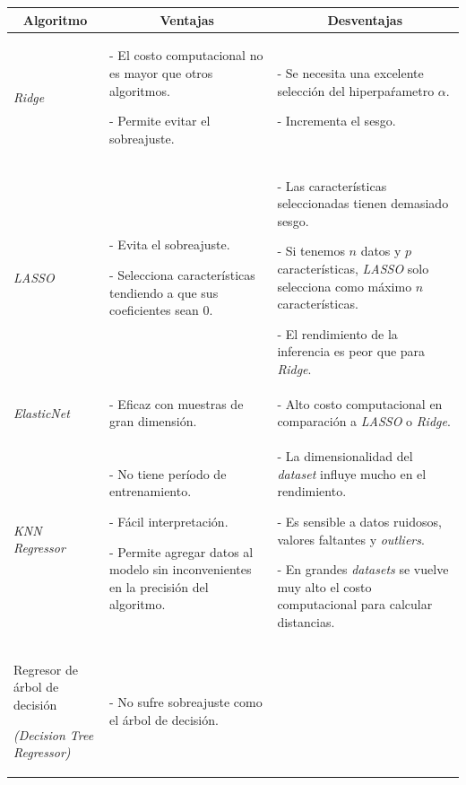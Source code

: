 \documentclass[a4paper,12pt]{article}
\begin{document}
\begin{landscape}

	\setcounter{page}{22}
		
	\begin{table}[]
		\centering
		\begin{tabularx}{\hsize}{|X|X|X|}
			\hline
			\multicolumn{1}{|c|}{\textbf{Algoritmo}} & \multicolumn{1}{|c|}{\textbf{Ventajas}} & \multicolumn{1}{|c|}{\textbf{Desventajas}} \\
			\hline
			\textit{Ridge}   & 
			- El costo computacional no es mayor que otros algoritmos.
						
			- Permite evitar el sobreajuste. & 
			- Se necesita una excelente selección del hiperpaŕametro $\alpha$. 
						
			- Incrementa el sesgo.
			\\ \hline
			\textit{LASSO}      & 
			- Evita el sobreajuste. 
						
			- Selecciona características tendiendo a que sus coeficientes sean 0. & 
			- Las características seleccionadas tienen demasiado sesgo. 
						
			- Si tenemos $n$ datos y $p$ características, \textit{LASSO} solo selecciona como máximo $n$ características. 
						
			- El rendimiento de la inferencia es peor que para \textit{Ridge}.
						
			\\ \hline
			\textit{ElasticNet}           & 
			- Eficaz con muestras de gran dimensión.
			& 
			- Alto costo computacional en comparación a \textit{LASSO} o \textit{Ridge}.
			\\ \hline
			\textit{KNN Regressor} & 
			- No tiene período de entrenamiento.
						
			- Fácil interpretación.
						
			- Permite agregar datos al modelo sin inconvenientes en la precisión del algoritmo.
			&
			- La dimensionalidad del \textit{dataset} influye mucho en el rendimiento.
						
			- Es sensible a datos ruidosos, valores faltantes y \textit{outliers}.
						
			- En grandes \textit{datasets} se vuelve muy alto el costo computacional para calcular distancias.			
						
			\\ \hline
			Regresor de árbol de decisión
						
			\textit{(Decision Tree Regressor)} & 
			- No sufre sobreajuste como el árbol de decisión.
						

\end{tabularx}
\end{table}
\end{landscape}
\end{document}
